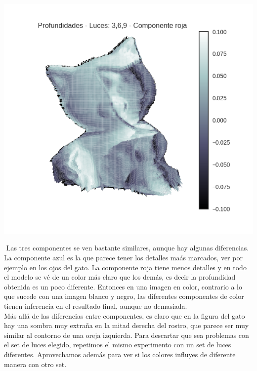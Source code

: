 \begin{figure}[H]
\begin{minipage}{.5\textwidth}
\end{minipage}
\end{figure}

{\centering
  \includegraphics[width=0.5\linewidth]{informe/imagenes/profundidades/gato369Rojo.png}
}

$ $\newline
Las tres componentes se ven bastante similares, aunque hay algunas diferencias. La componente azul es la que parece tener los detalles maás marcados, ver por ejemplo en los ojos del gato. La componente roja tiene menos detalles y en todo el modelo se vé de un color más claro que los demás, es decir la profundidad obtenida es un poco diferente. Entonces en una imagen en color, contrario a lo que sucede con una imagen blanco y negro, las diferentes componentes de color tienen inferencia en el resultado final, aunque no demasiada. \\

Más allá de las diferencias entre componentes, es claro que en la figura del gato hay una sombra muy extraña en la mitad derecha del rostro, que parece ser muy similar al contorno de una oreja izquierda. Para descartar que sea problemas con el set de luces elegido, repetimos el mismo experimento con un set de luces diferentes. Aprovechamos además para ver si los colores influyes de diferente manera con otro set. \\

